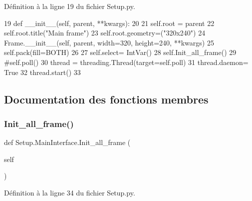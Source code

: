 Définition à la ligne 19 du fichier Setup.\+py.


\begin{DoxyCode}
19     \textcolor{keyword}{def }\_\_init\_\_(self, parent, **kwargs):
20 
21         self.root = parent
22         self.root.title(\textcolor{stringliteral}{"Main frame"})
23         self.root.geometry=(\textcolor{stringliteral}{"320x240"})
24         Frame.\_\_init\_\_(self, parent, width=320, height=240, **kwargs)
25         self.pack(fill=BOTH)
26 
27         self.select= IntVar()
28         self.Init\_all\_frame()
29         \textcolor{comment}{#self.poll()
}
30         thread = threading.Thread(target=self.poll)
31         thread.daemon= \textcolor{keyword}{True}
32         thread.start()
33     
\end{DoxyCode}


\subsection{Documentation des fonctions membres}
\mbox{\label{classSetup_1_1MainInterface_aee0717844e2994e5508650ab68308275}} 
\subsubsection{\texorpdfstring{Init\+\_\+all\+\_\+frame()}{Init\_all\_frame()}}
{\footnotesize\ttfamily def Setup.\+Main\+Interface.\+Init\+\_\+all\+\_\+frame (\begin{DoxyParamCaption}\item[{}]{self }\end{DoxyParamCaption})}



Définition à la ligne 34 du fichier Setup.\+py.


